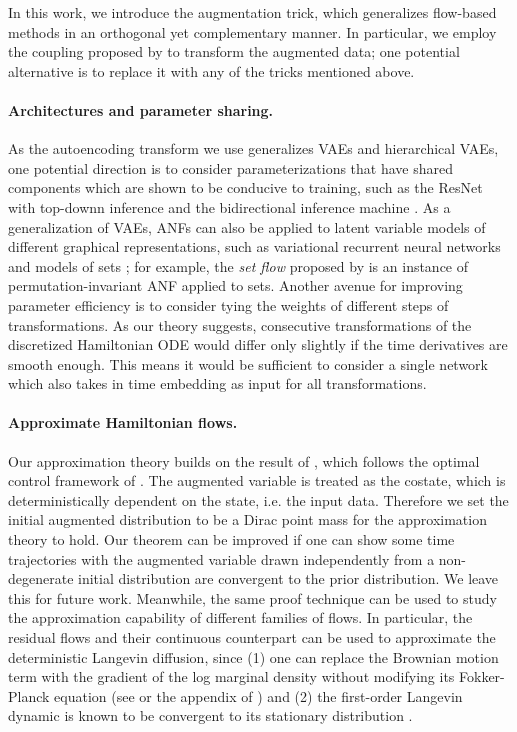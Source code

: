 \documentclass{article}
\begin{document}
In this work, we introduce the augmentation trick, which generalizes flow-based methods in an orthogonal yet complementary manner. 
In particular, we employ the coupling proposed by \citet{dinh2016density} to transform the augmented data; one potential alternative is to replace it with any of the tricks mentioned above. 

\paragraph{Architectures and parameter sharing.} As the autoencoding transform we use generalizes VAEs and hierarchical VAEs, one potential direction is to consider parameterizations that have shared components which are shown to be conducive to training, such as the ResNet with top-downn inference \citep{kingma2016improved} and the bidirectional inference machine \citep{maaloe2019biva}.
As a generalization of VAEs, ANFs can also be applied to latent variable models of different graphical representations, such as variational recurrent neural networks \citep{chung2015recurrent} and models of sets \citep{edwards2016towards}; for example, the \emph{set flow} proposed by \citet{rasul2019set} is an instance of permutation-invariant ANF applied to sets. 
Another avenue for improving parameter efficiency is to consider tying the weights of different steps of transformations. 
As our theory suggests, consecutive transformations of the discretized Hamiltonian ODE would differ only slightly if the time derivatives are smooth enough. 
This means it would be sufficient to consider a single network which also takes in time embedding as input for all transformations.

\paragraph{Approximate Hamiltonian flows.}
Our approximation theory builds on the result of \citet{wang2019accelerated}, which follows the optimal control framework of \citet{wibisono2016variational}.
The augmented variable is treated as the costate, which is deterministically dependent on the state, i.e. the input data. 
Therefore we set the initial augmented distribution to be a Dirac point mass for the approximation theory to hold. 
Our theorem can be improved if one can show some time trajectories with 
the augmented variable drawn independently from a non-degenerate initial distribution are convergent to the prior distribution. 
We leave this for future work. 
Meanwhile, the same proof technique can be used to study the approximation capability of different families of flows.
In particular, the residual flows \citep{behrmann2018invertible,chen2019residualflows} and their continuous counterpart \citep{chen2018neural,grathwohl2018ffjord} can be used to approximate the deterministic Langevin diffusion, since
(1) one can replace the Brownian motion term with the gradient of the log marginal density without modifying its Fokker-Planck equation (see \citet{hoffman2019langevin} or the appendix of \citet{wang2019accelerated}) and (2) the first-order Langevin dynamic is known to be convergent to its stationary distribution \citep{roberts1996exponential}. 
\end{document}
